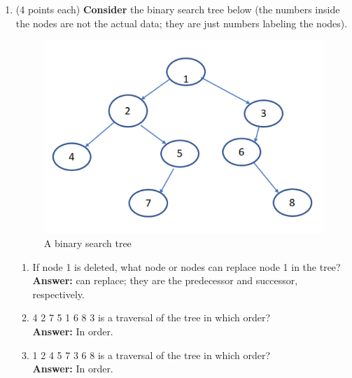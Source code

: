 \documentclass[12pt, a4paper]{article}
\newcommand{\squeezeup}{\vspace{-16pt}}%
\begin{document}
\begin{enumerate}
    \item (4 points each) \textbf{Consider} the binary search tree below
        (the numbers inside the nodes are not the actual data; they are just numbers labeling the nodes).
    \begin{figure}[H]
        \includegraphics[max width=\textwidth/2, center]{"5.png"}
        \caption{A binary search tree}
        \label{fig:5-BST}
    \end{figure}\squeezeup

    \begin{enumerate}

        \item If node 1 is deleted, what node or nodes can replace node 1 in the tree? \\
        \hspace*{\fill} \textbf{Answer:}  can replace; they are the predecessor and successor, respectively.
        
        \item 4 2 7 5 1 6 8 3 is a traversal of the tree in which order? \\
        \hspace*{\fill} \textbf{Answer:} In  order.
        
        \item 1 2 4 5 7 3 6 8 is a traversal of the tree in which order? \\
        \hspace*{\fill} \textbf{Answer:} In  order.
    
    \end{enumerate}




\end{enumerate}
\end{document}
